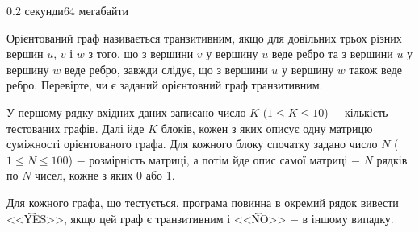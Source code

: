 \begin{problem}{}{}{}{0.2 секунди}{64 мегабайти}

Орієнтований граф називається транзитивним, якщо для довільних трьох різних вершин $u$, $v$ і $w$ з того,
що з вершини $v$ у вершину $u$ веде ребро та з вершини $u$ у вершину $w$ веде ребро, завжди слідує, що з вершини $u$ у вершину $w$ також веде ребро.
Перевірте, чи є заданий орієнтовний граф транзитивним.

\InputFile
У першому рядку вхідних даних записано число $K$ ($1 \le K \le 10$) $-$ кількість тестованих графів.
Далі йде $K$ блоків, кожен з яких описує одну матрицю суміжності орієнтованого графа.
Для кожного блоку спочатку задано число $N$ ($1 \le N \le 100$) $-$ розмірність матриці, а потім йде опис самої матриці $-$ $N$ рядків по $N$ чисел, кожне з яких 0 або 1.

\OutputFile
Для кожного графа, що тестується, програма повинна в окремий рядок вивести <<{\t{YES}}>>, якщо цей граф є транзитивним і <<{\t{NO}}>> $-$ в іншому випадку.

\Example

\begin{example}
\end{example}

\end{problem}
